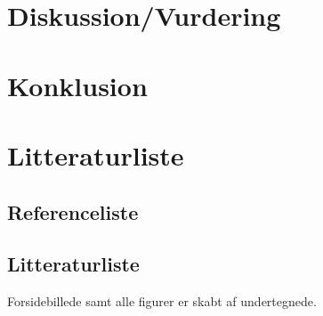\documentclass[12pt, a4paper]{article}
\begin{document}
\begin{refsection}
\section{Diskussion/Vurdering} %
\section{Konklusion} %
\newpage
\section{Litteraturliste}
\subsection{Referenceliste}
\printbibliography[title=Cited]
\end{refsection}
\subsection{Litteraturliste}
\nocite{*}
\printbibliography
Forsidebillede samt alle figurer er skabt af undertegnede.
\end{document}

